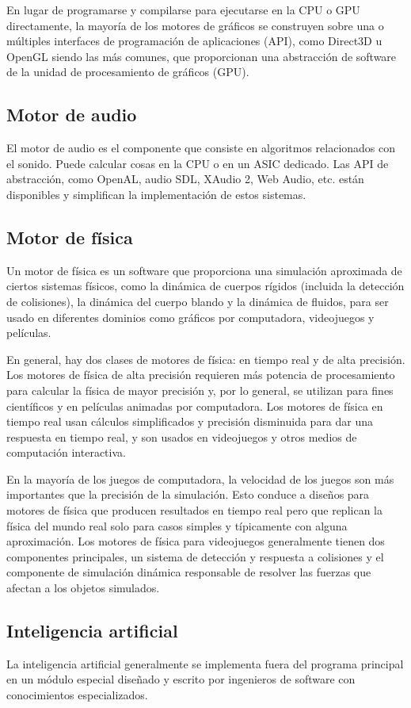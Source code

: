 En lugar de programarse y compilarse para ejecutarse en la CPU o GPU directamente, la mayoría de los motores de gráficos se construyen sobre una o múltiples interfaces de programación de aplicaciones (API), como Direct3D u OpenGL siendo las más comunes, que proporcionan una abstracción de software de la unidad de procesamiento de gráficos (GPU).

\subsection{Motor de audio}

El motor de audio es el componente que consiste en algoritmos relacionados con el sonido. Puede calcular cosas en la CPU o en un ASIC dedicado. Las API de abstracción, como OpenAL, audio SDL, XAudio 2, Web Audio, etc. están disponibles y simplifican la implementación de estos sistemas.

\subsection{Motor de física}

Un motor de física es un software que proporciona una simulación aproximada de ciertos sistemas físicos, como la dinámica de cuerpos rígidos (incluida la detección de colisiones), la dinámica del cuerpo blando y la dinámica de fluidos, para ser usado en diferentes dominios como gráficos por computadora, videojuegos y películas.

En general, hay dos clases de motores de física: en tiempo real y de alta precisión. Los motores de física de alta precisión requieren más potencia de procesamiento para calcular la física de mayor precisión y, por lo general, se utilizan para fines científicos y en películas animadas por computadora. Los motores de física en tiempo real usan cálculos simplificados y precisión disminuida para dar una respuesta en tiempo real, y son usados en videojuegos y otros medios de computación interactiva.

En la mayoría de los juegos de computadora, la velocidad de los juegos son más importantes que la precisión de la simulación. Esto conduce a diseños para motores de física que producen resultados en tiempo real pero que replican la física del mundo real solo para casos simples y típicamente con alguna aproximación. Los motores de física para videojuegos generalmente tienen dos componentes principales, un sistema de detección y respuesta a colisiones y el componente de simulación dinámica responsable de resolver las fuerzas que afectan a los objetos simulados.

\subsection{Inteligencia artificial}

La inteligencia artificial generalmente se implementa fuera del programa principal en un módulo especial diseñado y escrito por ingenieros de software con conocimientos especializados.
